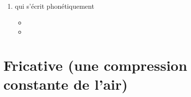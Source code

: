 \begin{enumerate}

\item {} qui
  s'écrit phonétiquement
  \href{https://en.wikipedia.org/wiki/Glottal\_stop}{}
  
  \begin{itemize}
  \item{}
  \item{}
  \end{itemize}

  
\end{enumerate}

\section{Fricative (une compression constante de
  l'air)}\label{sec:fricative}



\subsection{}\label{subsec:f}

